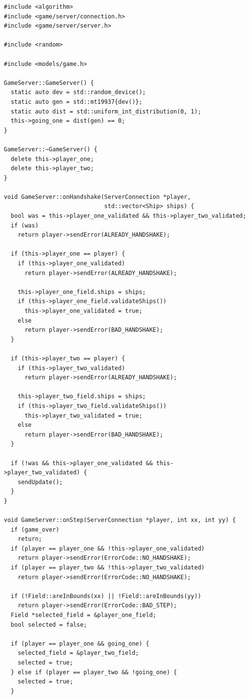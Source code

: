 \documentclass[a4paper,14pt]{extarticle}
\begin{document}
\begin{verbatim}
#include <algorithm>
#include <game/server/connection.h>
#include <game/server/server.h>

#include <random>

#include <models/game.h>

GameServer::GameServer() {
  static auto dev = std::random_device();
  static auto gen = std::mt19937{dev()};
  static auto dist = std::uniform_int_distribution(0, 1);
  this->going_one = dist(gen) == 0;
}

GameServer::~GameServer() {
  delete this->player_one;
  delete this->player_two;
}

void GameServer::onHandshake(ServerConnection *player,
                             std::vector<Ship> ships) {
  bool was = this->player_one_validated && this->player_two_validated;
  if (was)
    return player->sendError(ALREADY_HANDSHAKE);

  if (this->player_one == player) {
    if (this->player_one_validated)
      return player->sendError(ALREADY_HANDSHAKE);

    this->player_one_field.ships = ships;
    if (this->player_one_field.validateShips())
      this->player_one_validated = true;
    else
      return player->sendError(BAD_HANDSHAKE);
  }

  if (this->player_two == player) {
    if (this->player_two_validated)
      return player->sendError(ALREADY_HANDSHAKE);

    this->player_two_field.ships = ships;
    if (this->player_two_field.validateShips())
      this->player_two_validated = true;
    else
      return player->sendError(BAD_HANDSHAKE);
  }

  if (!was && this->player_one_validated && this->player_two_validated) {
    sendUpdate();
  }
}

void GameServer::onStep(ServerConnection *player, int xx, int yy) {
  if (game_over)
    return;
  if (player == player_one && !this->player_one_validated)
    return player->sendError(ErrorCode::NO_HANDSHAKE);
  if (player == player_two && !this->player_two_validated)
    return player->sendError(ErrorCode::NO_HANDSHAKE);

  if (!Field::areInBounds(xx) || !Field::areInBounds(yy))
    return player->sendError(ErrorCode::BAD_STEP);
  Field *selected_field = &player_one_field;
  bool selected = false;

  if (player == player_one && going_one) {
    selected_field = &player_two_field;
    selected = true;
  } else if (player == player_two && !going_one) {
    selected = true;
  }


\end{verbatim}
\end{document}
